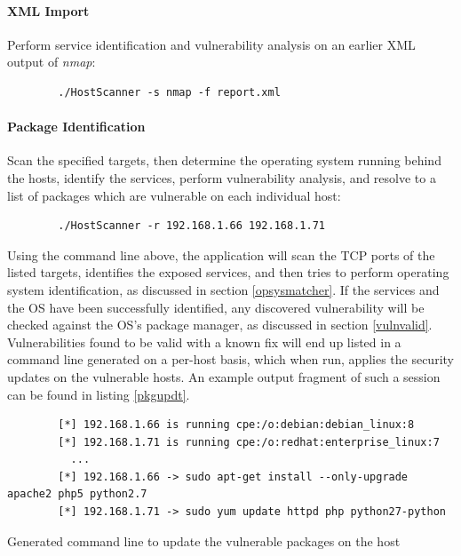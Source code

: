 \documentclass[a4paper,12pt]{article}
\begin{document}
	\vspace{-0.4in}
	\paragraph*{XML Import} Perform service identification and vulnerability analysis on an earlier XML output of \textit{nmap}:

	\begin{listing}[H]
	\begin{verbatim}
		./HostScanner -s nmap -f report.xml
	\end{verbatim}
	\end{listing}
	
	\vspace{-0.4in}
	\paragraph*{Package Identification} Scan the specified targets, then determine the operating system running behind the hosts, identify the services, perform vulnerability analysis, and resolve to a list of packages which are vulnerable on each individual host:

	\begin{listing}[H]
	\begin{verbatim}
		./HostScanner -r 192.168.1.66 192.168.1.71
	\end{verbatim}
	\end{listing}

	\vspace{-0.25in}
	Using the command line above, the application will scan the TCP ports of the listed targets, identifies the exposed services, and then tries to perform operating system identification, as discussed in section \ref{opsysmatcher}. If the services and the OS have been successfully identified, any discovered vulnerability will be checked against the OS's package manager, as discussed in section \ref{vulnvalid}. Vulnerabilities found to be valid with a known fix will end up listed in a command line generated on a per-host basis, which when run, applies the security updates on the vulnerable hosts. An example output fragment of such a session can be found in listing \ref{pkgupdt}.

	\begin{listing}[H]
		\begin{verbatim}
		[*] 192.168.1.66 is running cpe:/o:debian:debian_linux:8
		[*] 192.168.1.71 is running cpe:/o:redhat:enterprise_linux:7
		  ...
		[*] 192.168.1.66 -> sudo apt-get install --only-upgrade apache2 php5 python2.7
		[*] 192.168.1.71 -> sudo yum update httpd php python27-python
		\end{verbatim}
		\caption{Generated command line to update the vulnerable packages on the host}
		\label{pkgupdt}
	\end{listing}
\end{document}
